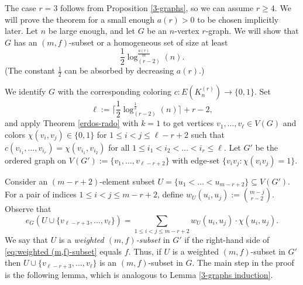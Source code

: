 \documentclass[11pt]{article}
\let\oldendproof\endproof
\renewenvironment{proof}[1][\proofname]{%
	\oldproof[\bf #1]%
}{\oldendproof}
\theoremstyle{plain}
\begin{document}
\begin{proof}[Proof of Theorem \ref{main-result-1}]
    The case $r=3$ follows from Proposition \ref{3-graphs}, so we can assume $r \geq 4$. 
    We will prove the theorem for a small enough $a(r) > 0$ to be chosen implicitly later.
    Let $n$ be large enough, and let $G$ be an $n$-vertex $r$-graph.
    We will show that $G$ has an $(m,f)$-subset or a homogeneous set of size at least 
    $$
    \frac{1}{2}\log_{(r-2)}^{\frac{a(r)}{m}}(n).
    $$
    (The constant $\frac{1}{2}$ can be absorbed by decreasing $a(r)$.)
    
    We identify $G$ with the corresponding coloring $c:E(K_n^{(r)}) \to \{0,1\}$. 
    Set 
    $$
    \ell := \Big\lceil \frac{1}{2} \log^{\frac{1}{2}}_{(r-2)}(n) \Big\rceil + r-2,
    $$
    and apply
    Theorem \ref{erdos-rado} with $k=1$ to get vertices $v_1,\dots,v_{\ell} \in V(G)$ and colors $\chi(v_i,v_j) \in \{0,1\}$ for $1 \leq i < j \leq \ell-r+2$ such that $c(v_{i_1},\dots,v_{i_r}) = \chi(v_{i_1},v_{i_2})$ for all $1 \leq i_1 < i_2 < \dots < i_r \leq \ell$. Let $G'$ be the ordered graph on $V(G') := \{v_1,\dots,v_{\ell-r+2}\}$ with edge-set 
    $\{v_iv_j : \chi(v_iv_j) = 1\}$. 

    Consider an $(m-r+2)$-element subset $U = \{u_1 < \dots < u_{m-r+2}\} \subseteq V(G')$. For a pair of indices $1 \leq i < j \leq m-r+2$, define $w_U(u_i,u_j) := \binom{m-j}{r-2}$. 
    Observe that %
    \begin{equation}\label{eq:weighted (m,f)-subset}
    e_G(U \cup \{v_{\ell-r+3},\dots,v_{\ell}\}) = 
    \sum_{1 \leq i < j \leq m-r+2} w_U(u_i,u_j) \cdot \chi(u_i,u_j).
    \end{equation}
    We say that 
    $U$ is a {\em weighted $(m,f)$-subset} in $G'$ if the right-hand side of \eqref{eq:weighted (m,f)-subset} equals $f$.
    Thus, if $U$ is a weighted $(m,f)$-subset in $G'$ then $U \cup \{v_{\ell-r+3},\dots,v_{\ell}\}$ is an $(m,f)$-subset in $G$. 
    The main step in the proof is the following lemma, which is analogous to Lemma \ref{3-graphs induction}.


\end{proof}
\end{document}
